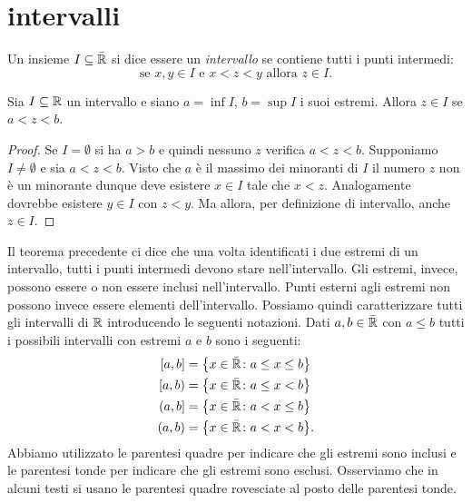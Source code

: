 \section{intervalli}

\begin{definition}[intervallo]
\label{def:intervallo}%
%
Un insieme $I\subseteq \bar{\mathbb R}$ si dice essere un \emph{intervallo}
se contiene tutti i punti intermedi:
\[
  \text{se $x, y \in I$ e $x<z<y$ allora $z \in I$.}
\]
\end{definition}
%
\begin{theorem}
Sia $I\subseteq \mathbb R$ un intervallo e siano $a=\inf I$, $b=\sup I$
i suoi estremi. Allora
$z\in I$ se $a < z < b$.
\end{theorem}
%
\begin{proof}
Se $I=\emptyset$ si ha $a>b$ e quindi nessuno $z$ verifica $a<z<b$.
Supponiamo $I\neq \emptyset$ e
sia $a < z < b$.
Visto che $a$ è il massimo dei minoranti di $I$
il numero $z$ non è un minorante dunque
deve esistere $x \in I$ tale
che $x < z$. Analogamente dovrebbe esistere $y\in I$
con $z<y$.
Ma allora, per definizione di intervallo, anche $z\in I$.
\end{proof}

Il teorema precedente ci dice che una volta identificati i due estremi
di un intervallo, tutti i punti intermedi devono stare nell'intervallo.
Gli estremi, invece, possono essere o non essere inclusi nell'intervallo.
Punti esterni agli estremi non possono invece essere elementi dell'intervallo.
Possiamo quindi caratterizzare tutti gli intervalli di $\mathbb R$
introducendo le seguenti notazioni. Dati $a,b\in \bar {\mathbb R}$ con $a\le b$
tutti i possibili intervalli con estremi $a$ e $b$ sono i seguenti:
\begin{equation}\label{eq:499494}
\begin{aligned}
[a,b] &= \ENCLOSE{x\in \bar \RR\colon a \le x \le b} \\
[a,b) &= \ENCLOSE{x\in \bar \RR\colon a \le x < b} \\
(a,b] &= \ENCLOSE{x\in \bar \RR\colon a < x \le b}\\
(a,b) &= \ENCLOSE{x\in \bar \RR\colon a < x < b}.
\end{aligned}
\end{equation}
Abbiamo utilizzato le parentesi quadre per indicare che gli estremi
sono inclusi e le parentesi tonde per indicare che gli estremi sono esclusi.
Osserviamo che in alcuni testi si usano le parentesi quadre rovesciate al posto
delle parentesi tonde.

